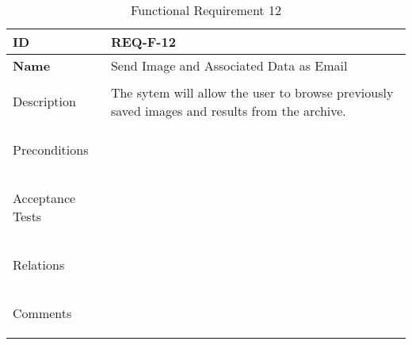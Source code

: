 \begin{table}[H]
    \begin{tabular}[t]{ | >{\bfseries}l | p{9.5cm} |}

    \hline
    ID
    &  REQ-F-12 \\ \hline

    Name
    & Send Image and Associated Data as Email \\ \hline

    Description
    & The sytem will allow the user to browse previously saved images and results from the archive. \\ \hline

    Preconditions
    &  \\ \hline

    Acceptance Tests
    & \\ \hline

    Relations
    &  \\ \hline

    Comments
    &  \\ \hline

    \end{tabular}

    \caption{Functional Requirement 12}
    \label{fig:req_f_12}

\end{table}